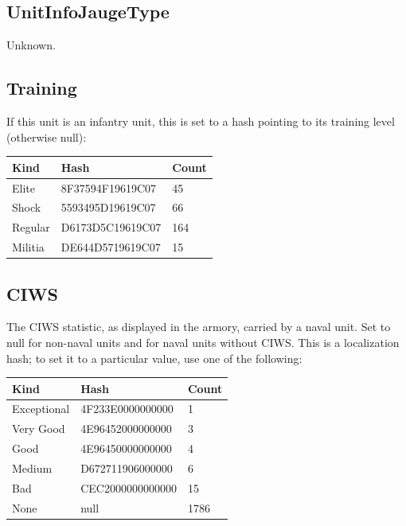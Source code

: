 \documentclass{article}
\begin{document}
\subsection{UnitInfoJaugeType}

Unknown.

\subsection{Training}

If this unit is an infantry unit, this is set to a hash pointing to its training level (otherwise null):

\begin{center}
    \begin{tabular}{ | l | l | l |}
    \hline
	Kind & Hash & Count\\ \hline
	Elite & 8F37594F19619C07 & 45\\
	Shock & 5593495D19619C07 & 66\\
	Regular & D6173D5C19619C07 & 164\\
	Militia & DE644D5719619C07 & 15\\
    \hline
    \end{tabular}
\end{center}

\subsection{CIWS}

The CIWS statistic, as displayed in the armory, carried by a naval unit. Set to null for non-naval units and for naval units without CIWS. This is a localization hash; to set it to a particular value, use one of the following:

\begin{center}
    \begin{tabular}{ | l | l | l |}
    \hline
	Kind & Hash & Count\\ \hline
	Exceptional & 4F233E0000000000 & 1\\
	Very Good & 4E96452000000000 & 3\\
	Good & 4E96450000000000 & 4\\
	Medium & D672711906000000 & 6\\
	Bad & CEC2000000000000 & 15\\
	None & null & 1786\\
    \hline
    \end{tabular}
\end{center}
\end{document}
